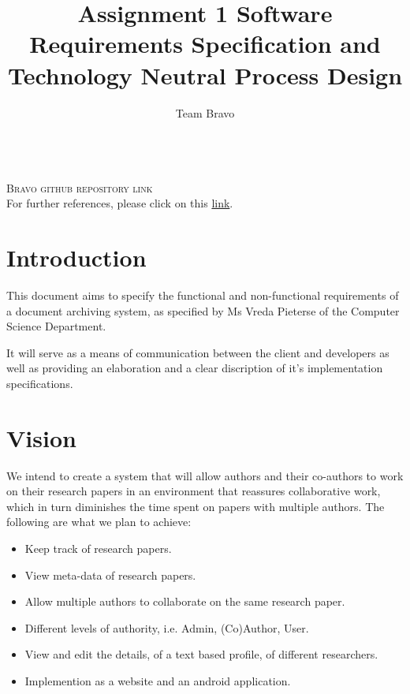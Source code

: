 \documentclass[11pt]{article}
\author{Team Bravo}
\title{Assignment 1 Software Requirements Specification and Technology Neutral Process Design}
\begin{document}
\setlength{\parskip}{6pt}



\renewcommand{\thesection}{\arabic{section}}
\newpage

\tableofcontents 

\begin{center} 
\textsc{} \\[1cm]
\textsc{\Large Bravo github repository link}\\[0.5cm]
For further references, please click on this \href{https://github.com/ish1993/Bravo}{link}.
\end{center}

\newpage

\section{Introduction}

This document aims to specify the functional and non-functional requirements of a document archiving system, as specified by Ms Vreda Pieterse of the Computer Science Department.

It will serve as a means of communication between the client and developers as well as providing an elaboration and a clear discription of it's implementation specifications.

\section{Vision}

We intend to create a system that will allow authors and their co-authors to work on their research papers in an environment that reassures collaborative work, which in turn diminishes the time spent on papers with multiple authors. The following are what we plan to achieve: 

\begin{itemize}
	\item Keep track of research papers.
	\item View meta-data of research papers. 
	\item Allow multiple authors to collaborate on the same research paper. 
	\item Different levels of authority, i.e. Admin, (Co)Author, User.
	\item View and edit the details, of a text based profile, of different researchers. 
	\item Implemention as a website and an android application.
\end{itemize} 
\end{document}
